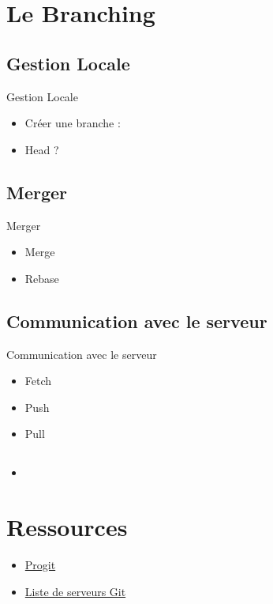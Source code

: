 \documentclass{beamer}
\begin{document}

\section{Le Branching}
\subsection*{Gestion Locale}
\begin{frame}{Gestion Locale}
  \begin{itemize}
  \item Créer une branche :
  \item Head ?
  \end{itemize}
\end{frame}

\subsection*{Merger}
\begin{frame}{Merger}
  \begin{itemize}
  \item Merge
  \item Rebase
  \end{itemize}
\end{frame}

\subsection*{Communication avec le serveur}
\begin{frame}{Communication avec le serveur}
  \begin{itemize}
  \item Fetch
  \item Push
  \item Pull
  \end{itemize}
\end{frame}

\subsection*{}
\begin{frame}{}
  \begin{itemize}
  \item   
  \end{itemize}
\end{frame}


\section{Ressources}
\begin{frame}{}
  \begin{itemize}
  \item \href{http://progit.org/about.html}{Progit}
  \item \href{http://git.or.cz/gitwiki/GitHosting}{Liste de serveurs Git}
  \end{itemize}
\end{frame}
\end{document}
